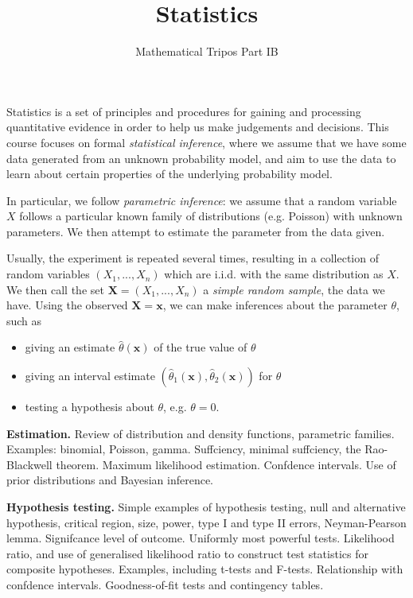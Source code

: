 \documentclass[a4paper,11pt]{article}
\title{Statistics}
\author{Mathematical Tripos Part IB}
\affiliation{University of Cambridge}
\theoremstyle{definition}
\numberwithin{equation}{section}
\begin{document}
\maketitle
\flushbottom
\clearpage

Statistics is a set of principles and procedures for gaining and processing quantitative evidence in order to help us make judgements and decisions. This course focuses on formal \emph{statistical inference}, where we assume that we have some data generated from an unknown probability model, and aim to use the data to learn about certain properties of the underlying probability model.

In particular, we follow \emph{parametric inference}: we assume that a random variable $X$ follows a particular known family of distributions (e.g. Poisson) with unknown parameters. We then attempt to estimate the parameter from the data given.

Usually, the experiment is repeated several times, resulting in a collection of random variables $(X_1,...,X_n)$ which are i.i.d. with the same distribution as $X$. We then call the set $\mathbf{X}=(X_1,...,X_n)$ a \emph{simple random sample}, the data we have. Using the observed $\mathbf{X}=\mathbf{x}$, we can make inferences about the parameter $\theta$, such as
\begin{itemize}
    \item giving an estimate $\hat{\theta}(\mathbf{x})$ of the true value of $\theta$
    \item giving an interval estimate $(\hat{\theta}_1(\mathbf{x}),\hat{\theta}_2(\mathbf{x}))$ for $\theta$
    \item testing a hypothesis about $\theta$, e.g. $\theta=0$.
\end{itemize}

\hrulefill

\textbf{Estimation.}
Review of distribution and density functions, parametric families. Examples: binomial, Poisson, gamma. Suffciency, minimal suffciency, the Rao-Blackwell theorem. Maximum likelihood estimation. Confdence intervals. Use of prior distributions and Bayesian inference.

\textbf{Hypothesis testing.}
Simple examples of hypothesis testing, null and alternative hypothesis, critical region, size, power, type I and type II errors, Neyman-Pearson lemma. Signifcance level of outcome. Uniformly most powerful tests. Likelihood ratio, and use of generalised likelihood ratio to construct test statistics for composite hypotheses. Examples, including t-tests and F-tests. Relationship with confdence intervals. Goodness-of-fit tests and contingency tables.
\end{document}
